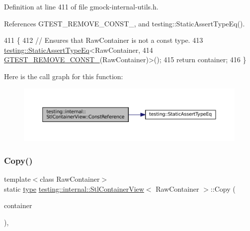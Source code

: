 Definition at line 411 of file gmock-\/internal-\/utils.\+h.



References G\+T\+E\+S\+T\+\_\+\+R\+E\+M\+O\+V\+E\+\_\+\+C\+O\+N\+S\+T\+\_\+, and testing\+::\+Static\+Assert\+Type\+Eq().


\begin{DoxyCode}
411                                                                        \{
412     \textcolor{comment}{// Ensures that RawContainer is not a const type.}
413     \hyperlink{namespacetesting_a661e70fc6afeb5c085eed3716aa45059}{testing::StaticAssertTypeEq}<RawContainer,
414         \hyperlink{gtest-internal_8h_a2ffec8c60510eb130af387f5ce9a756a}{GTEST\_REMOVE\_CONST\_}(RawContainer)>();
415     \textcolor{keywordflow}{return} container;
416   \}
\end{DoxyCode}
Here is the call graph for this function\+:
\nopagebreak
\begin{figure}[H]
\begin{center}
\leavevmode
\includegraphics[width=350pt]{classtesting_1_1internal_1_1StlContainerView_a36eccf53329730f6e55c12002128bf25_cgraph}
\end{center}
\end{figure}
\mbox{\label{classtesting_1_1internal_1_1StlContainerView_a441123838221f1284873f66ed968f279}} 
\subsubsection{\texorpdfstring{Copy()}{Copy()}}
{\footnotesize\ttfamily template$<$class Raw\+Container$>$ \\
static \hyperlink{classtesting_1_1internal_1_1StlContainerView_a2b2c63a6dcdbfe63fb0ee121ebf463ba}{type} \hyperlink{classtesting_1_1internal_1_1StlContainerView}{testing\+::internal\+::\+Stl\+Container\+View}$<$ Raw\+Container $>$\+::Copy (\begin{DoxyParamCaption}\item[{const Raw\+Container \&}]{container }\end{DoxyParamCaption})\hspace{0.3cm}{\ttfamily [inline]}, {\ttfamily [static]}}



